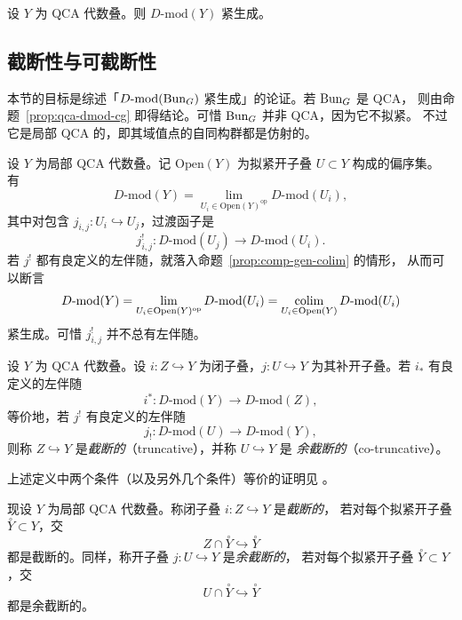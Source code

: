 \begin{proposition}
\label{prop:qca-dmod-cg}
设 $Y$ 为 QCA 代数叠。则 $D\text{-}\mathrm{mod}(Y)$ 紧生成。
\end{proposition}

\subsection{截断性与可截断性}
\label{sec:trunc}

本节的目标是综述「$D\text{-}\mathrm{mod}(\mathrm{Bun}_G)$ 紧生成」的论证。若 $\mathrm{Bun}_G$ 是 QCA，
则由命题~\ref{prop:qca-dmod-cg} 即得结论。可惜 $\mathrm{Bun}_G$ 并非 QCA，因为它不拟紧。
不过它是局部 QCA 的，即其域值点的自同构群都是仿射的。

设 $Y$ 为局部 QCA 代数叠。记 $\mathrm{Open}(Y)$ 为拟紧开子叠 $U\subset Y$ 构成的偏序集。
有
\[
D\text{-}\mathrm{mod}(Y)=\lim_{U_i\in \mathrm{Open}(Y)^{\mathrm{op}}}D\text{-}\mathrm{mod}(U_i),
\]
其中对包含 $j_{i,j}\colon U_i\hookrightarrow U_j$，过渡函子是
\[
j^{!}_{i,j}\colon D\text{-}\mathrm{mod}(U_j)\to D\text{-}\mathrm{mod}(U_i).
\]
若 $j^{!}$ 都有良定义的左伴随，就落入命题~\ref{prop:comp-gen-colim} 的情形，
从而可以断言
\[
D\text{-}\mathrm{mod}(Y)=\lim_{U_i\in \mathrm{Open}(Y)^{\mathrm{op}}}D\text{-}\mathrm{mod}(U_i)
=\operatorname*{colim}_{U_i\in \mathrm{Open}(Y)}D\text{-}\mathrm{mod}(U_i)
\]
紧生成。可惜 $j^{!}_{i,j}$ 并不总有左伴随。

\begin{definition}[{[DG15, 定义 3.1.5]}]
\label{def:truncative}
设 $Y$ 为 QCA 代数叠。设 $i\colon Z\hookrightarrow Y$ 为闭子叠，$j\colon U\hookrightarrow Y$
为其补开子叠。若 $i_*$ 有良定义的左伴随
\[
i^{*}\colon D\text{-}\mathrm{mod}(Y)\to D\text{-}\mathrm{mod}(Z),
\]
等价地，若 $j^{!}$ 有良定义的左伴随
\[
j_{!}\colon D\text{-}\mathrm{mod}(U)\to D\text{-}\mathrm{mod}(Y),
\]
则称 $Z\hookrightarrow Y$ 是\emph{截断的}（truncative），并称 $U\hookrightarrow Y$ 是
\emph{余截断的}（co-truncative）。
\end{definition}
上述定义中两个条件（以及另外几个条件）等价的证明见 \cite[命题 3.1.2]{DG15}。

\begin{definition}[{[DG15, 定义 3.8.2]}]
\label{def:truncative-local}
现设 $Y$ 为局部 QCA 代数叠。称闭子叠 $i\colon Z\hookrightarrow Y$ 是\emph{截断的}，
若对每个拟紧开子叠 $\overset{\circ}{Y}\subset Y$，交
\[
Z\cap \overset{\circ}{Y}\hookrightarrow \overset{\circ}{Y}
\]
都是截断的。同样，称开子叠 $j\colon U\hookrightarrow Y$ 是\emph{余截断的}，
若对每个拟紧开子叠 $\overset{\circ}{Y}\subset Y$，交
\[
U\cap \overset{\circ}{Y}\hookrightarrow \overset{\circ}{Y}
\]
都是余截断的。
\end{definition}

